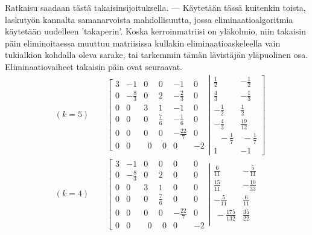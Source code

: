 Ratkaisu saadaan tästä takaisinsijoituksella. --- Käytetään tässä kuitenkin toista, laskutyön
kannalta samanarvoista mahdollisuutta, jossa eliminaatioalgoritmia käytetään uudelleen 
'takaperin'. Koska kerroinmatriisi on yläkolmio, niin takaisin päin eliminoitaessa muuttuu
matriisissa kullakin eliminaatioaskeleella vain tukialkion kohdalla oleva sarake, tai tarkemmin
tämän lävistäjän yläpuolinen osa. Eliminaatiovaiheet takaisin päin ovat seuraavat.
\begin{align*}
&(k=5) \qquad \left[\begin{array}{rrrrrr}
                    3&-1&0&0&-1&0\\[0.5mm] 0&-\frac{8}{3}&0&2&-\frac{2}{3}&0\\[0.5mm]
                    0&0&3&1&-1&0\\[0.5mm] 0&0&0&\frac{7}{6}&-\frac{1}{6}&0\\[0.5mm]
                    0&0&0&0&-\frac{22}{7}&0\\0&0&\ \ 0&\ \ 0&0&-2 
                    \end{array} \right.
       \left. \left|\begin{array}{rr}
                    \frac{1}{2}&-\frac{1}{2}\\[0.5mm]\frac{4}{3}&-\frac{1}{3}\\[0.5mm]
                    -\frac{1}{2}&\frac{1}{2}\\[0.5mm]-\frac{4}{3}&\frac{19}{12}\\[0.5mm]
                    \ \ \ -\frac{1}{7}&\ -\frac{1}{7}\\ 1&-1
                    \end{array} \right. \right] \\[5mm]
&(k=4) \qquad \left[\begin{array}{rrrrrr}
                  3&-1&0&0&0&0\\[0.5mm] 0&-\frac{8}{3}&0&2&0&0\\[0.5mm] 0&0&3&1&0&0\\[0.5mm]
                  0&0&0&\frac{7}{6}&0&0\\[0.5mm] 0&0&0&0&-\frac{22}{7}&0\\0&0&\ \ 0&\ \ 0&0&-2 
                  \end{array} \right.
       \left. \left|\begin{array}{rr}
                    \frac{6}{11}&-\frac{5}{11}\\[0.5mm]\frac{15}{11}&-\frac{10}{33}\\[0.5mm]
                    -\frac{5}{11}&\frac{6}{11}\\[0.5mm]\ -\frac{175}{132}&\frac{35}{22}\\[0.5mm]

\end{array}
\end{align*}
